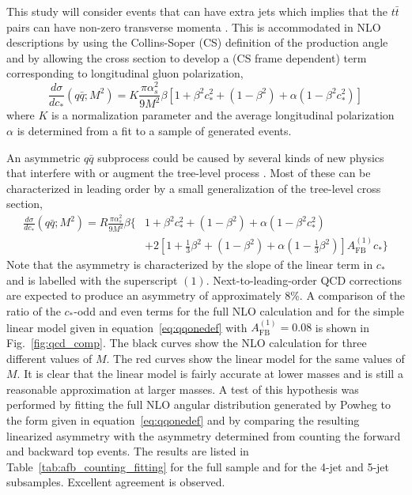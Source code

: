 \documentclass{cmspaperpdf}
\begin{document}
This study will consider events that can have extra jets which implies that the $t\bar t$ pairs can have non-zero transverse momenta .  This is accommodated in NLO descriptions by using the Collins-Soper (CS) definition \cite{Collins:1977iv} of the production angle and by allowing the cross section to develop a (CS frame dependent) term corresponding to longitudinal gluon polarization,
\begin{equation}
\frac{d\sigma}{dc_*}(q\bar q;M^2) = K\frac{\pi\alpha_s^2}{9M^2}\beta\left[1+\beta^2c_*^2+\left(1-\beta^2\right)+\alpha\left(1-\beta^2c_*^2\right)\right]
\label{eq:qqnlodef}
\end{equation}
where $K$ is a normalization parameter and the average longitudinal polarization $\alpha$ is determined from a fit to a sample of generated events.

An asymmetric $q\bar q$ subprocess could be caused by several kinds of new physics that interfere with or augment the tree-level process   \cite{Cao:2010zb, Gresham:2011pa}.  Most of these can be characterized in leading order by a small generalization of the tree-level cross section,
\begin{align}
\frac{d\sigma}{dc_*}(q\bar q;M^2) = R\frac{\pi\alpha_s^2}{9M^2}\beta\biggl\lbrace&1+\beta^2c_*^2+\left(1-\beta^2\right)+\alpha \left(1-\beta^2c_*^2\right) \nonumber \\
&+2\left[1+\frac{1}{3}\beta^2+(1-\beta^2)+\alpha\left(1-\frac{1}{3}\beta^2\right)\right]A_\mathrm{FB}^{(1)}c_*\biggr\rbrace
\label{eq:qqonedef}
\end{align}
Note that the asymmetry is characterized by the slope of the linear term in $c_*$ and is labelled with the superscript $(1)$.  Next-to-leading-order QCD corrections are expected  \cite{Kuhn:1998kw} to produce an asymmetry of approximately 8\%.  A comparison of the ratio of the $c_*$-odd and even terms for the full NLO calculation and for the simple linear model given in equation~\ref{eq:qqonedef} with $A_\mathrm{FB}^{(1)} = 0.08$ is shown in Fig.~\ref{fig:qcd_comp}.  The black curves show the NLO calculation for three different values of $M$.  The red curves show the linear model for the same values of $M$.  It is clear that the linear model is fairly accurate at lower masses and is still a reasonable approximation at larger masses.  A test of this hypothesis was performed by fitting the full NLO angular distribution generated by Powheg to the form given in equation~\ref{eq:qqonedef} and by comparing the resulting linearized asymmetry with the asymmetry determined from counting the forward and backward top events.  The results are listed in Table~\ref{tab:afb_counting_fitting} for the full sample and for the 4-jet and 5-jet subsamples.  Excellent agreement is observed.
\end{document}
